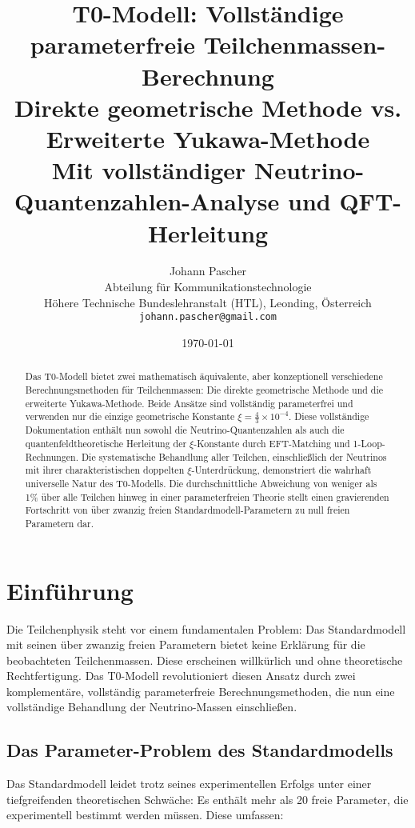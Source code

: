 \documentclass[12pt,a4paper]{article}
\title{T0-Modell: Vollständige parameterfreie Teilchenmassen-Berechnung \\
	\large Direkte geometrische Methode vs. Erweiterte Yukawa-Methode \\
	\large Mit vollständiger Neutrino-Quantenzahlen-Analyse und QFT-Herleitung}
\author{Johann Pascher\\
	Abteilung für Kommunikationstechnologie\\
	Höhere Technische Bundeslehranstalt (HTL), Leonding, Österreich\\
	\texttt{johann.pascher@gmail.com}}
\date{\today}
\newcommand{\xipar}{\xi}
\begin{document}
	\maketitle
	
	\begin{abstract}
		Das T0-Modell bietet zwei mathematisch äquivalente, aber konzeptionell verschiedene Berechnungsmethoden für Teilchenmassen: Die direkte geometrische Methode und die erweiterte Yukawa-Methode. Beide Ansätze sind vollständig parameterfrei und verwenden nur die einzige geometrische Konstante $\xipar = \frac{4}{3} \times 10^{-4}$. Diese vollständige Dokumentation enthält nun sowohl die Neutrino-Quantenzahlen als auch die quantenfeldtheoretische Herleitung der $\xi$-Konstante durch EFT-Matching und 1-Loop-Rechnungen. Die systematische Behandlung aller Teilchen, einschließlich der Neutrinos mit ihrer charakteristischen doppelten $\xi$-Unterdrückung, demonstriert die wahrhaft universelle Natur des T0-Modells. Die durchschnittliche Abweichung von weniger als 1\% über alle Teilchen hinweg in einer parameterfreien Theorie stellt einen gravierenden Fortschritt von über zwanzig freien Standardmodell-Parametern zu null freien Parametern dar.
	\end{abstract}
	
	\tableofcontents
	\newpage
	
	\section{Einführung}
	\label{sec:introduction}
	
	Die Teilchenphysik steht vor einem fundamentalen Problem: Das Standardmodell mit seinen über zwanzig freien Parametern bietet keine Erklärung für die beobachteten Teilchenmassen. Diese erscheinen willkürlich und ohne theoretische Rechtfertigung. Das T0-Modell revolutioniert diesen Ansatz durch zwei komplementäre, vollständig parameterfreie Berechnungsmethoden, die nun eine vollständige Behandlung der Neutrino-Massen einschließen.
	
	\subsection{Das Parameter-Problem des Standardmodells}
	\label{subsec:parameter_problem}
	
	Das Standardmodell leidet trotz seines experimentellen Erfolgs unter einer tiefgreifenden theoretischen Schwäche: Es enthält mehr als 20 freie Parameter, die experimentell bestimmt werden müssen. Diese umfassen:
	
\end{document}
